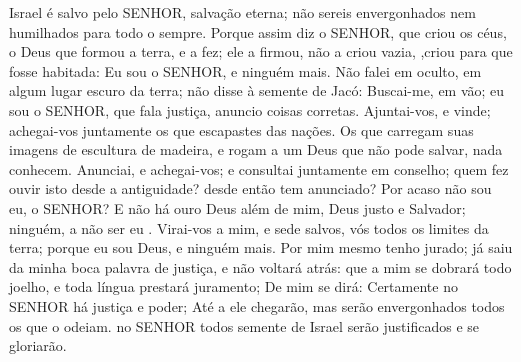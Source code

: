 { Israel é salvo pelo SENHOR,
{} salvação eterna; não sereis envergonhados nem humilhados para todo o sempre.
Porque assim diz o SENHOR, que criou os céus, o Deus que formou a terra, e a fez; ele a firmou, não a criou
{} vazia,
{} ,criou para que fosse habitada: Eu sou o SENHOR, e ninguém mais.
Não falei em oculto,
{} em algum lugar escuro da terra; não disse à semente de Jacó: Buscai-me, em vão; eu sou o SENHOR, que fala justiça,
{} anuncio coisas corretas.
Ajuntai-vos, e vinde; achegai-vos juntamente os que escapastes das nações. Os que carregam suas imagens de escultura de madeira, e rogam a um Deus que não pode salvar, nada conhecem.
Anunciai, e achegai-vos; e consultai juntamente em conselho; quem fez ouvir isto desde a antiguidade?
{} desde então tem anunciado? Por acaso não sou eu, o SENHOR? E não há ouro Deus além de mim, Deus justo e Salvador; ninguém, a não ser eu
{} .
Virai-vos a mim, e sede salvos, vós todos os limites da terra; porque eu sou Deus, e ninguém mais.
Por mim mesmo tenho jurado; já saiu da minha boca palavra de justiça, e não voltará atrás: que a mim se dobrará todo joelho, e toda língua prestará juramento;
De mim se dirá: Certamente no SENHOR há justiça e poder; Até a ele chegarão, mas serão envergonhados todos os que o odeiam.
 no SENHOR todos
{} semente de Israel serão justificados e se gloriarão.

}
